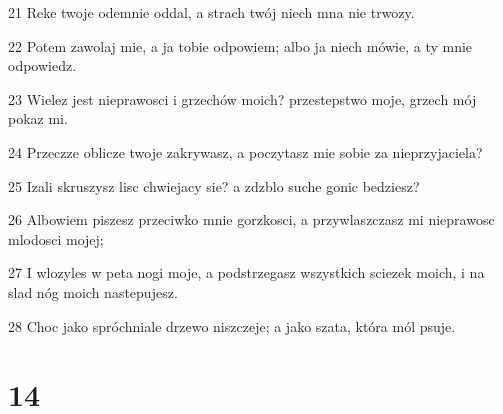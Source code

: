 \par 21 Reke twoje odemnie oddal, a strach twój niech mna nie trwozy.
\par 22 Potem zawolaj mie, a ja tobie odpowiem; albo ja niech mówie, a ty mnie odpowiedz.
\par 23 Wielez jest nieprawosci i grzechów moich? przestepstwo moje, grzech mój pokaz mi.
\par 24 Przeczze oblicze twoje zakrywasz, a poczytasz mie sobie za nieprzyjaciela?
\par 25 Izali skruszysz lisc chwiejacy sie? a zdzblo suche gonic bedziesz?
\par 26 Albowiem piszesz przeciwko mnie gorzkosci, a przywlaszczasz mi nieprawosc mlodosci mojej;
\par 27 I wlozyles w peta nogi moje, a podstrzegasz wszystkich sciezek moich, i na slad nóg moich nastepujesz.
\par 28 Choc jako spróchniale drzewo niszczeje; a jako szata, która mól psuje.

\chapter{14}

